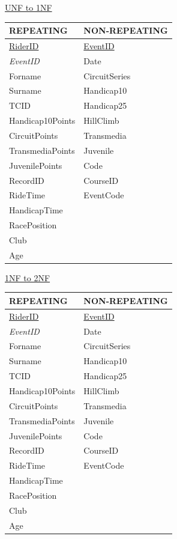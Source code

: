\underline{UNF to 1NF}

\begin{tabular}{|l|l|}
\hline
REPEATING & NON-REPEATING \\ \hline
\underline{RiderID} & \underline{EventID} \\ \hline
\emph{EventID} & Date \\ \hline
Forname & CircuitSeries \\ \hline 
Surname & Handicap10 \\ \hline 
TCID & Handicap25 \\ \hline
Handicap10Points & HillClimb \\ \hline 
CircuitPoints & Transmedia \\ \hline
TransmediaPoints & Juvenile \\ \hline
JuvenilePoints & Code \\ \hline
RecordID & CourseID \\ \hline
RideTime & EventCode \\ \hline
HandicapTime & \\ \hline
RacePosition & \\ \hline
Club & \\ \hline
Age & \\ \hline

\end{tabular}

\underline{1NF to 2NF}

\begin{tabular}{|l|l|}
\hline
REPEATING           & NON-REPEATING \\ \hline
\underline{RiderID} & \underline{EventID} \\ \hline
\emph{EventID}      & Date \\ \hline
Forname             & CircuitSeries \\ \hline 
Surname             & Handicap10 \\ \hline 

TCID                & Handicap25 \\ \hline
Handicap10Points    & HillClimb \\ \hline 
CircuitPoints       & Transmedia \\ \hline
TransmediaPoints    & Juvenile \\ \hline
JuvenilePoints      & Code \\ \hline

RecordID            & CourseID \\ \hline
RideTime            & EventCode \\ \hline
HandicapTime        & \\ \hline
RacePosition        & \\ \hline
Club                & \\ \hline
Age                 & \\ \hline
\end{tabular}

